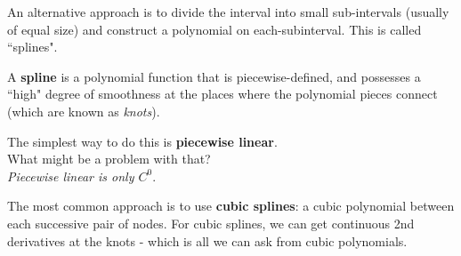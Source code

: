 \documentclass[12pt, answers]{exam}
\begin{document}
An alternative approach is to divide the interval into small sub-intervals (usually of equal size) and construct a polynomial on each-subinterval. This is called ``splines".

%
%
%
%
%
\ifprintanswers
A \textbf{spline} is a polynomial function that is piecewise-defined, and possesses a ``high" degree of smoothness at the places where the polynomial pieces connect (which are known as \textit{knots}).
\else
\vspace*{3em}
\fi

The simplest way to do this is \textbf{piecewise linear}.\\ What might be a problem with that?\\ \textit{Piecewise linear is only $C^0$}.

The most common approach is to use \textbf{cubic splines}: a cubic polynomial between each successive pair of nodes. For cubic splines, we can get continuous 2nd derivatives at the knots - which is all we can ask from cubic polynomials. 
\end{document}
